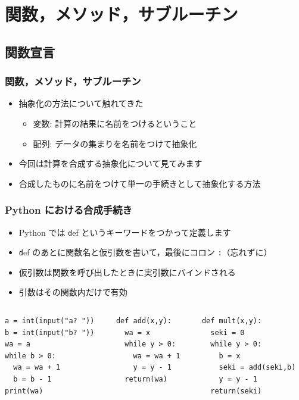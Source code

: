 %
%
\section{関数，メソッド，サブルーチン}
\subsection{関数宣言}
\begin{frame}[containsverbatim,label=function,shrink]
\frametitle{関数，メソッド，サブルーチン}
  \begin{itemize}
\item 抽象化の方法について触れてきた
    \begin{itemize}
\item 変数: 計算の結果に名前をつけるということ
\item 配列: データの集まりを名前をつけて抽象化
    \end{itemize}
\item 今回は計算を合成する抽象化について見てみます
\item 合成したものに名前をつけて単一の手続きとして抽象化する方法
  \end{itemize}
\end{frame}
\begin{frame}
\frametitle{Python における合成手続き}
  \begin{itemize}
\item Python では {\texttt def} というキーワードをつかって定義します
\item {\texttt def} のあとに関数名と仮引数を書いて，最後にコロン {\texttt :}（忘れずに）
\item 仮引数は関数を呼び出したときに実引数にバインドされる
\item 引数はその関数内だけで有効
  \end{itemize}
  \begin{columns}[t]
    \begin{column}{0.35\textwidth}
      \begin{lstlisting}[caption={add.py},label=lst:definefun]
a = int(input("a? "))
b = int(input("b? "))
wa = a
while b > 0:
  wa = wa + 1
  b = b - 1
print(wa)
      \end{lstlisting}
    \end{column}
    \begin{column}{0.3\textwidth}
      \begin{lstlisting}[caption={mult\_basicsonly.py},label=lst:definefun2]
def add(x,y):
  wa = x 
  while y > 0:
    wa = wa + 1
    y = y - 1
  return(wa)
      \end{lstlisting}
    \end{column}
    \begin{column}{0.3\textwidth}
      \begin{lstlisting}[caption={mult\_basicsonly.py},label=lst:definefun3,firstnumber=last]
def mult(x,y):
  seki = 0
  while y > 0:
    b = x
    seki = add(seki,b)
    y = y - 1
  return(seki)
      \end{lstlisting}
    \end{column}
  \end{columns}
\end{frame}
